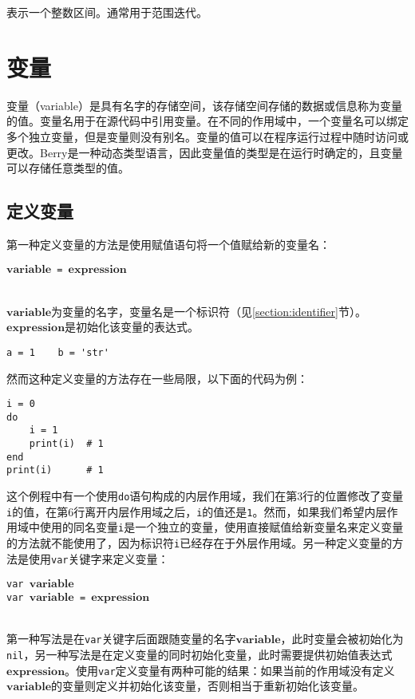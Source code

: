 表示一个整数区间。通常用于范围迭代。

\section{变量}

变量（variable）是具有名字的存储空间，该存储空间存储的数据或信息称为变量的值。变量名用于在源代码中引用变量。在不同的作用域中，一个变量名可以绑定多个独立变量，但是变量则没有别名。变量的值可以在程序运行过程中随时访问或更改。Berry是一种动态类型语言，因此变量值的类型是在运行时确定的，且变量可以存储任意类型的值。

\subsection{定义变量}

第一种定义变量的方法是使用赋值语句将一个值赋给新的变量名：
\begin{algorithm}
$\bm{variable}$\texttt{ = }$\bm{expression}$
\end{algorithm}\vspace{-0.6em}\\
$\bm{variable}$为变量的名字，变量名是一个标识符（见\ref{section:identifier}节）。$\bm{expression}$是初始化该变量的表达式。
\begin{lstlisting}[language=berry, numbers=none]
a = 1    b = 'str'
\end{lstlisting}
然而这种定义变量的方法存在一些局限，以下面的代码为例：
\begin{lstlisting}[language=berry]
i = 0
do
    i = 1
    print(i)  # 1
end
print(i)      # 1
\end{lstlisting}
这个例程中有一个使用\texttt{do}语句构成的内层作用域，我们在第3行的位置修改了变量\texttt{i}的值，在第6行离开内层作用域之后，\texttt{i}的值还是\texttt{1}。然而，如果我们希望内层作用域中使用的同名变量\texttt{i}是一个独立的变量，使用直接赋值给新变量名来定义变量的方法就不能使用了，因为标识符\texttt{i}已经存在于外层作用域。另一种定义变量的方法是使用\texttt{var}关键字来定义变量：
\begin{algorithm}
\texttt{var }$\bm{variable}$ \\
\texttt{var }$\bm{variable}$\texttt{ = }$\bm{expression}$
\end{algorithm}\vspace{-0.6em}\\
第一种写法是在\texttt{var}关键字后面跟随变量的名字$\bm{variable}$，此时变量会被初始化为\texttt{nil}，另一种写法是在定义变量的同时初始化变量，此时需要提供初始值表达式$\bm{expression}$。使用\texttt{var}定义变量有两种可能的结果：如果当前的作用域没有定义$\bm{variable}$的变量则定义并初始化该变量，否则相当于重新初始化该变量。

